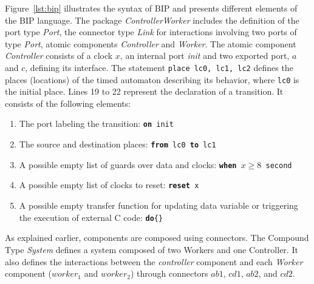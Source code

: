 \begin{example}\label{exp:bip}
Figure~\ref{lst:bip} illustrates the syntax of BIP and presents different elements of the BIP 
  language. The package \emph{ControllerWorker} includes the definition of the
  port type \emph{Port}, the connector type \emph{Link} for interactions involving two 
  ports of type \emph{Port}, atomic components \emph{Controller} and \emph{Worker}.
  The atomic component \emph{Controller} consists of a clock $x$, an internal port \emph{init}
  and two exported port, $a$ and $c$, defining its interface. The statement 
  \texttt{place lc0, lc1, lc2} defines the places (locations) of the timed automaton describing its behavior,
  where \texttt{lc0} is the initial place. Lines 19 to 22 represent the declaration of 
  a transition. It consists of the following elements:
  \begin{enumerate}
    \item The port labeling the transition: \texttt{\textbf{on} init}
    \item The source and destination places: \texttt{\textbf{from} lc0 \textbf{to} lc1}
    \item A possible empty list of guards over data and clocks: \texttt{\textbf{when} 
      $x\ge 8$ second}
    \item A possible empty list of clocks to reset: \texttt{\textbf{reset} x}
    \item A possible empty transfer function for updating data variable or triggering the 
      execution of external C code: \texttt{\textbf{do}\{\}}
  \end{enumerate} 

As explained earlier, components are composed using connectors. The Compound Type \emph{System}
defines a system composed of two Workers and one Controller. It also defines the interactions 
between the \emph{controller} component and each \emph{Worker} component ($worker_1$ and 
$worker_2$) through connectors $ab1$, $cd1$, $ab2$, and $cd2$.
\end{example}
